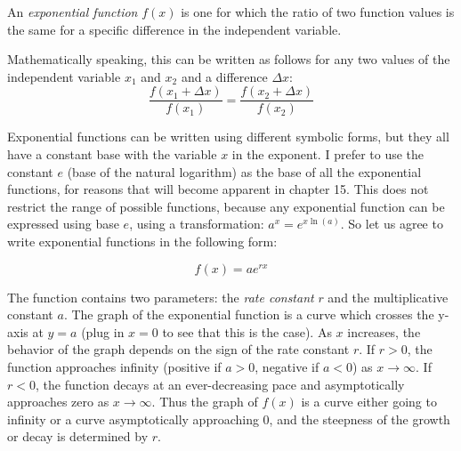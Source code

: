 \documentclass[
  letterpaper,
  DIV=11,
  numbers=noendperiod]{scrreprt}
\begin{document}
\begin{tcolorbox}[enhanced jigsaw, coltitle=black, arc=.35mm, opacitybacktitle=0.6, breakable, bottomtitle=1mm, toptitle=1mm, titlerule=0mm, colback=white, leftrule=.75mm, rightrule=.15mm, colframe=quarto-callout-note-color-frame, colbacktitle=quarto-callout-note-color!10!white, opacityback=0, title=\textcolor{quarto-callout-note-color}{\faInfo}\hspace{0.5em}{Definition}, left=2mm, toprule=.15mm, bottomrule=.15mm]

An \emph{exponential function} \(f(x)\) is one for which the ratio of
two function values is the same for a specific difference in the
independent variable.

\end{tcolorbox}

Mathematically speaking, this can be written as follows for any two
values of the independent variable \(x_1\) and \(x_2\) and a difference
\(\Delta x\):
\[ \frac{f(x_1 + \Delta x)}{f(x_1)} = \frac{f(x_2 + \Delta x)}{f(x_2)}\]

Exponential functions can be written using different symbolic forms, but
they all have a constant base with the variable \(x\) in the exponent. I
prefer to use the constant \(e\) (base of the natural logarithm) as the
base of all the exponential functions, for reasons that will become
apparent in chapter 15. This does not restrict the range of possible
functions, because any exponential function can be expressed using base
\(e\), using a transformation: \(a^x = e^{x \ln(a)}\). So let us agree
to write exponential functions in the following form:

\begin{equation}
 f(x) = a e^{rx}
\label{eq:exp_funk}
\end{equation}

The function contains two parameters: the
\emph{rate constant} \(r\) and the
multiplicative constant \(a\). The graph of the exponential function is
a curve which crosses the y-axis at \(y=a\) (plug in \(x=0\) to see that
this is the case). As \(x\) increases, the behavior of the graph depends
on the sign of the rate constant \(r\). If \(r>0\), the function
approaches infinity (positive if \(a>0\), negative if \(a<0\)) as
\(x \to \infty\). If \(r<0\), the function decays at an ever-decreasing
pace and asymptotically approaches zero as \(x \to \infty\). Thus the
graph of \(f(x)\) is a curve either going to infinity or a curve
asymptotically approaching 0, and the steepness of the growth or decay
is determined by \(r\).
\end{document}
